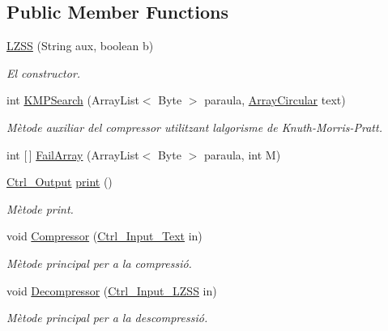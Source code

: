 \subsection*{Public Member Functions}
\begin{DoxyCompactItemize}
\item 
\hyperlink{classdomini_1_1algorithm_1_1LZSS_a991f29ccc89ecbb5645ea8f123205e20}{L\+Z\+SS} (String aux, boolean b)
\begin{DoxyCompactList}\small\item\em El constructor. \end{DoxyCompactList}\item 
int \hyperlink{classdomini_1_1algorithm_1_1LZSS_a88e88f2bb6e984cadf48e1c71f0234fc}{K\+M\+P\+Search} (Array\+List$<$ Byte $>$ paraula, \hyperlink{classdomini_1_1utils_1_1ArrayCircular}{Array\+Circular} text)
\begin{DoxyCompactList}\small\item\em Mètode auxiliar del compressor utilitzant l\textquotesingle{}algorisme de Knuth-\/\+Morris-\/\+Pratt. \end{DoxyCompactList}\item 
int \mbox{[}$\,$\mbox{]} \hyperlink{classdomini_1_1algorithm_1_1LZSS_a56733a42f84d7a58cc5db9ea5f67835f}{Fail\+Array} (Array\+List$<$ Byte $>$ paraula, int M)
\item 
\hyperlink{classpersistencia_1_1output_1_1Ctrl__Output}{Ctrl\+\_\+\+Output} \hyperlink{classdomini_1_1algorithm_1_1LZSS_a8172ff7c8aefb87c90c648bc1b6b78b9}{print} ()
\begin{DoxyCompactList}\small\item\em Mètode print. \end{DoxyCompactList}\item 
void \hyperlink{classdomini_1_1algorithm_1_1LZSS_a385d06ea406b7a0f1168370e9574531a}{Compressor} (\hyperlink{classpersistencia_1_1input_1_1Ctrl__Input__Text}{Ctrl\+\_\+\+Input\+\_\+\+Text} in)
\begin{DoxyCompactList}\small\item\em Mètode principal per a la compressió. \end{DoxyCompactList}\item 
void \hyperlink{classdomini_1_1algorithm_1_1LZSS_a3fcf941d4301a4a857c585b3770a0ecf}{Decompressor} (\hyperlink{classpersistencia_1_1input_1_1Ctrl__Input__LZSS}{Ctrl\+\_\+\+Input\+\_\+\+L\+Z\+SS} in)
\begin{DoxyCompactList}\small\item\em Mètode principal per a la descompressió. \end{DoxyCompactList}\end{DoxyCompactItemize}
